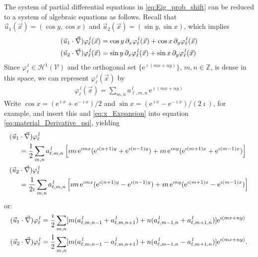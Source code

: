 \documentclass[11pt]{amsart}
\newcommand{\e}{\mathrm{e}}
\newcommand{\Vc}{\mathcal{V}}
\newcommand{\Hc}{\mathcal{H}}
\begin{document}
The system of partial differential equations in
\eqref{eq:Eig_prob_shift} can be reduced to a system of algebraic
equations as follows. Recall that
$\vec{u}_1(\vec{x})=(\cos{y},\cos{x})$ and
$\vec{u}_2(\vec{x})=(\sin{y},\sin{x})$, which implies 
%
\begin{align}\label{eq:material_Derivative_psi}
  (\vec{u}_1\cdot\vec{\nabla})\varphi_\ell^{\,l}(\vec{x})
          &=\cos{y}\,\partial_x\varphi_\ell^{\,l}(\vec{x})+\cos{x}\,\partial_y\varphi_\ell^{\,l}(\vec{x})\\
  (\vec{u}_2\cdot\vec{\nabla})\varphi_\ell^{\,l}(\vec{x})
          &=\sin{y}\,\partial_x\varphi_\ell^{\,l}(\vec{x})+\sin{x}\,\partial_y\varphi_\ell^{\,l}(\vec{x})\notag
\end{align}
%
Since $\varphi_\ell^{\,l}\in\Hc^1(\Vc)$ and the orthogonal set $\{\e^{\imath (mx+ny)}\}$,
$m,n\in\mathbb{Z}$, is dense in this space, we can represent
$\varphi_\ell^{\,l}(\vec{x})$ by
%
\begin{align}\label{eq:x_Expansion}
  \varphi_\ell^{\,l}(\vec{x})=\sum_{m,n}a^{\,l}_{\ell,m,n}\,\e^{\imath (mx+ny)}
\end{align}
%
Write $\cos{x}=(\e^{\imath x}+\e^{-\imath x})/2$ and
$\sin{x}=(\e^{\imath x}-\e^{-\imath x})/(2\imath)$, for example, and insert this
and \eqref{eq:x_Expansion} into equation
\eqref{eq:material_Derivative_psi}, yielding
%
\begin{align}\label{eq:Advection_Fourier}
  (\vec{u}_1&\cdot\vec{\nabla})\varphi_\ell^{\,l}\\
    &=\frac{1}{2}\sum_{m,n}a^{\,l}_{\ell,m,n}\left[
        \imath m\,\e^{\imath mx}(\e^{\imath(n+1)y}+\e^{\imath(n-1)y})
        +\imath n\,\e^{\imath ny}(\e^{\imath(m+1)x}+\e^{\imath(m-1)x})
                       \right]
    \notag\\
%    
  (\vec{u}_2&\cdot\vec{\nabla})\varphi_\ell^{\,l}\notag\\
    &=\frac{1}{2\imath}\sum_{m,n}a^{\,l}_{\ell,m,n}\left[
        \imath m\,\e^{\imath mx}(\e^{\imath(n+1)y}-\e^{\imath(n-1)y})
        +\imath n\,\e^{\imath ny}(\e^{\imath(m+1)x}-\e^{\imath(m-1)x})
                       \right]
                       \notag
\end{align}
%
or:
%
\begin{align}\label{eq:Algebraic_advection}
  (\vec{u}_1\cdot\vec{\nabla})\varphi_\ell^{\,l}
    &=\frac{\imath}{2}\sum_{m,n}
    [m(a^{\,l}_{\ell,m,n-1}+a^{\,l}_{\ell,m,n+1})+n(a^{\,l}_{\ell,m-1,n}+a^{\,l}_{\ell,m+1,n})]\e^{\imath (mx+ny)}
   \notag\\
  (\vec{u}_2\cdot\vec{\nabla})\varphi_\ell^{\,l}
    &=\frac{1}{2}\sum_{m,n}
    [m(a^{\,l}_{\ell,m,n-1}-a^{\,l}_{\ell,m,n+1})+n(a^{\,l}_{\ell,m-1,n}-a^{\,l}_{\ell,m+1,n})]\e^{\imath (mx+ny)} .
\end{align}
\end{document}
